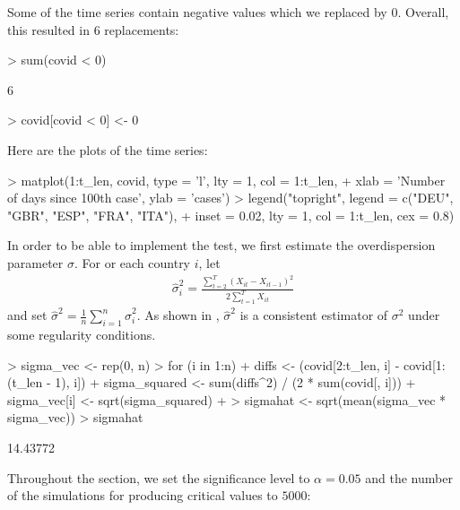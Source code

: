 \documentclass[a4paper]{scrartcl}
\begin{document}
Some of the time series contain negative values which we replaced by $0$. Overall, this resulted in $6$ replacements:

\begin{Schunk}
\begin{Sinput}
> sum(covid < 0)
\end{Sinput}
\begin{Soutput}
[1] 6
\end{Soutput}
\begin{Sinput}
> covid[covid < 0] <- 0
\end{Sinput}
\end{Schunk}

Here are the plots of the time series:

\begin{Schunk}
\begin{Sinput}
> matplot(1:t_len, covid, type = 'l', lty = 1, col = 1:t_len,
+         xlab = 'Number of days since 100th case', ylab = 'cases')
> legend("topright", legend = c("DEU", "GBR", "ESP", "FRA", "ITA"),
+        inset = 0.02, lty = 1, col = 1:t_len, cex = 0.8)
\end{Sinput}
\end{Schunk}

In order to be able to implement the test, we first estimate the overdispersion parameter $\sigma$. For or each country $i$, let
\begin{align*}
\hat{\sigma}_i^2 = \frac{\sum_{t=2}^T (X_{it}-X_{it-1})^2}{2 \sum_{t=1}^T X_{it}}
\end{align*}
and set $\hat{\sigma}^2 = \frac{1}{n} \sum_{i=1}^n \hat{\sigma}_i^2$. As shown in \cite{KhismatullinaVogt2023}, $\hat{\sigma}^2$ is a consistent estimator of $\sigma^2$ under some regularity conditions.


\begin{Schunk}
\begin{Sinput}
> sigma_vec <- rep(0, n)
> for (i in 1:n){
+   diffs <- (covid[2:t_len, i] - covid[1:(t_len - 1), i])
+   sigma_squared <- sum(diffs^2) / (2 * sum(covid[, i]))
+   sigma_vec[i] <- sqrt(sigma_squared)
+ }
> sigmahat <- sqrt(mean(sigma_vec * sigma_vec))
> sigmahat
\end{Sinput}
\begin{Soutput}
[1] 14.43772
\end{Soutput}
\end{Schunk}

Throughout the section, we set the significance level to $\alpha=0.05$ and the number of the simulations for producing critical values to $5000$:
\end{document}
